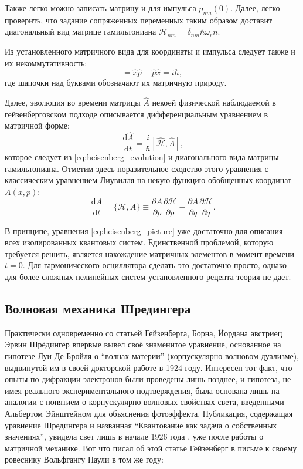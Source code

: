 \documentclass[14pt, a4paper]{extreport}
\newcommand{\diff}{\,\mathrm{d}}
\numberwithin{equation}{section}
\begin{document}
Также легко можно записать матрицу и для импульса $p_{nm}(0)$. Далее, легко проверить, что задание сопряженных переменных таким образом доставит диагональный вид матрице гамильтониана $\mathcal{H}_{nm} = \delta_{nm} \hbar \omega_r n $.

Из установленного матричного вида для координаты и импульса следует также и их некоммутативность:
\begin{equation}
	[\hat x, \hat p] = \hat x \hat p - \hat p \hat x = i\hbar,
\end{equation}
где шапочки над буквами обозначают их матричную природу.

Далее, эволюция во времени матрицы $\hat A$ некоей физической наблюдаемой в гейзенберговском подходе описывается дифференциальным уравнением в матричной форме:
\begin{equation}
	\frac{\diff \hat A}{\diff t} = \frac{i}{\hbar} [\hat{\mathcal{H}}, \hat A], \label{eq:heisenberg_picture}
\end{equation}
которое следует из \eqref{eq:heisenberg_evolution} и диагонального вида матрицы гамильтониана. Отметим здесь поразительное сходство этого уравнения с классическим уравнением Лиувилля на некую функцию обобщенных координат $ A(x, p) $:
\begin{equation}
	\frac{\diff A}{\diff t} = \{\mathcal{H}, A\} \equiv \frac{\partial A}{\partial p} \frac{\partial \mathcal{H}}{\partial p} -  \frac{\partial A}{\partial q}\frac{\partial \mathcal{H}}{\partial q}.
\end{equation}

В принципе, уравнения \eqref{eq:heisenberg_picture} уже достаточно для описания всех изолированных квантовых систем. Единственной проблемой, которую требуется решить, является нахождение матричных элементов в момент времени $t=0$. Для гармонического осциллятора сделать это достаточно просто, однако для более сложных нелинейных систем установленного рецепта теория не дает.

\subsection{Волновая механика Шредингера}


Практически одновременно со статьей Гейзенберга, Борна, Йордана австриец Эрвин Шрёдингер впервые вывел своё знаменитое уравнение, основанное на гипотезе Луи Де Бройля о ``волнах материи'' (корпускулярно-волновом дуализме), выдвинутой им в своей докторской работе в 1924 году. Интересен тот факт, что опыты по дифракции электронов были проведены лишь позднее, и гипотеза, не имея реального экспериментального подтверждения, была основана лишь на аналогии с понятием о корпускулярно-волновых свойствах света, введенными Альбертом Эйнштейном для объяснения фотоэффекта. Публикация, содержащая уравнение Шредингера и названная ``Квантование как задача о собственных значениях'', увидела свет лишь в начале 1926 года \cite{schrodinger2003collected}, уже после работы о матричной механике. Вот что писал об этой статье Гейзенберг в письме к своему ровеснику Вольфгангу Паули в том же году: 
\end{document}
